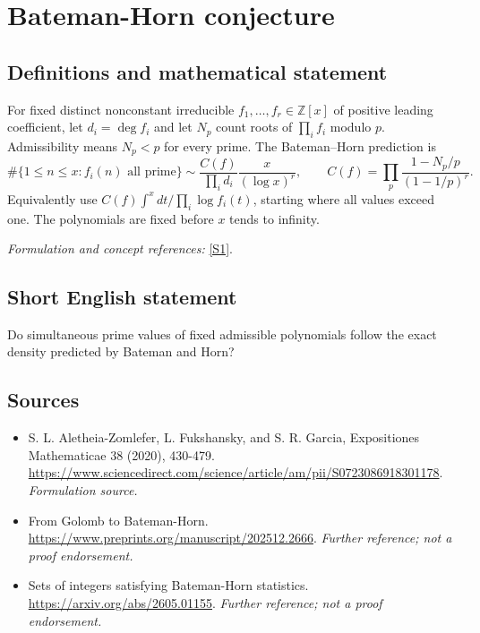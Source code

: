 \documentclass[11pt]{article}
\begin{document}
\section*{\texorpdfstring{Bateman-Horn conjecture}{Bateman-Horn conjecture}}\label{30006717}
\subsection{Definitions and mathematical statement}
For fixed distinct nonconstant irreducible $f_1,\ldots,f_r\in{\mathbb{Z}}[x]$ of positive leading coefficient, let $d_i=\deg f_i$ and let $N_p$ count roots of $\prod_i f_i$ modulo $p$. Admissibility means $N_p<p$ for every prime. The Bateman--Horn prediction is
\[
 \#\{1\le n\le x:f_i(n)\text{ all prime}\}
 \sim\frac{C(f)}{\prod_i d_i}\frac{x}{(\log x)^r},\qquad
 C(f)=\prod_p\frac{1-N_p/p}{(1-1/p)^r}.
\]
Equivalently use $C(f)\int^x dt/\prod_i\log f_i(t)$, starting where all values exceed one. The polynomials are fixed before $x$ tends to infinity.
\par\smallskip\textit{Formulation and concept references:} \href{https://www.sciencedirect.com/science/article/am/pii/S0723086918301178}{[S1]}.

\subsection{Short English statement}
Do simultaneous prime values of fixed admissible polynomials follow the exact density predicted by Bateman and Horn?
\subsection{Sources}
\begin{itemize}
\item[S1]S. L. Aletheia-Zomlefer, L. Fukshansky, and S. R. Garcia, Expositiones Mathematicae 38 (2020), 430-479.
\url{https://www.sciencedirect.com/science/article/am/pii/S0723086918301178}.
\textit{Formulation source.}
\item[S2]From Golomb to Bateman-Horn.
\url{https://www.preprints.org/manuscript/202512.2666}.
\textit{Further reference; not a proof endorsement.}
\item[S3]Sets of integers satisfying Bateman-Horn statistics.
\url{https://arxiv.org/abs/2605.01155}.
\textit{Further reference; not a proof endorsement.}
\end{itemize}
\end{document}
